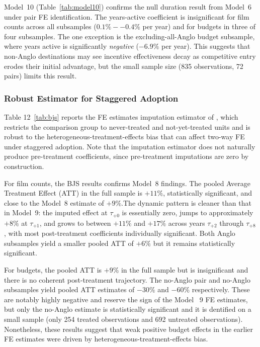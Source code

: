 Model~10 (Table~\ref{tab:model10}) confirms the null duration result from Model~6 under pair FE identification. The years-active coefficient is insignificant for film counts across all subsamples ($0.1\%--0.4\%$ per year) and for budgets in three of four subsamples. The one exception is the excluding-all-Anglo budget subsample, where years active is significantly \textit{negative} ($-6.9\%$ per year). This suggests that non-Anglo destinations may see incentive effectiveness decay as competitive entry erodes their initial advantage, but the small sample size (835 observations, 72 pairs) limits this result.

\subsubsection{Robust Estimator for Staggered Adoption}
\label{sec:results_bjs}

Table 12~\ref{tab:bjs} reports the FE estimates imputation estimator of \citet{borusyak2024}, which restricts the comparison group to never-treated and not-yet-treated units and is robust to the heterogeneous-treatment-effects bias that can affect two-way FE under staggered adoption.  Note that the imputation estimator does not naturally produce pre-treatment coefficients, since pre-treatment imputations are zero by construction. 

For film counts, the BJS results confirms Model~8 findings. The pooled Average Treatment Effect (ATT) in the full sample is $+11\%$, statistically significant, and close to the Model~8 estimate of $+9\%$.The dynamic pattern is cleaner than that in Model~9: the imputed effect at $\tau_{+0}$ is essentially zero, jumps to approximately $+8\%$ at $\tau_{+1}$, and grows to between $+11\%$ and $+17\%$ across years $\tau_{+2}$ through $\tau_{+8}$, with most post-treatment coefficients individually significant. Both Anglo subsamples yield a smaller pooled ATT of $+6\%$ but it remains statistically significant.

For budgets, the pooled ATT is $+9\%$ in the full sample but is insignificant and there is no coherent post-treatment trajectory. The no-Anglo pair and no-Anglo subsamples yield pooled ATT estimates of $-30\%$ and $-60\%$ respectively. These are notably highly negative and reserve the sign of the Model ~9 FE estimates, but only the no-Anglo estimate is statistically significant and it is dentified on a small sample (only 254 treated observations and 692 untreated observations). Nonetheless, these results suggest that weak positive budget effects in the earlier FE estimates were driven by heterogeneous-treatment-effects bias.

